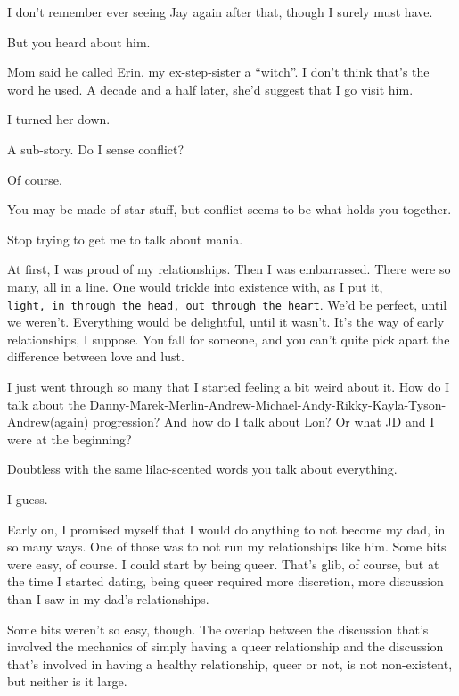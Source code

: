 \begin{leftcolumn}

I don't remember ever seeing Jay again after that, though I surely must have.

\begin{ally}
But you heard about him.
\end{ally}
Mom said he called Erin, my ex-step-sister a ``witch''. I don't think that's the word he used. A decade and a half later, she'd suggest that I go visit him.

I turned her down.

\begin{ally}
A sub-story. Do I sense conflict?
\end{ally}
Of course.

\begin{ally}
You may be made of star-stuff, but conflict seems to be what holds you together.
\end{ally}
Stop trying to get me to talk about mania.

At first, I was proud of my relationships. Then I was embarrassed. There were so many, all in a line. One would trickle into existence with, as I put it, \texttt{light,\ in\ through\ the\ head,\ out\ through\ the\ heart}. We'd be perfect, until we weren't. Everything would be delightful, until it wasn't. It's the way of early relationships, I suppose. You fall for someone, and you can't quite pick apart the difference between love and lust.

I just went through so many that I started feeling a bit weird about it. How do I talk about the Danny-Marek-Merlin-Andrew-Michael-Andy-Rikky-Kayla-Tyson-Andrew(again) progression? And how do I talk about Lon? Or what JD and I were at the beginning?

\begin{ally}
Doubtless with the same lilac-scented words you talk about everything.
\end{ally}
I guess.

Early on, I promised myself that I would do anything to not become my dad, in so many ways. One of those was to not run my relationships like him. Some bits were easy, of course. I could start by being queer. That's glib, of course, but at the time I started dating, being queer required more discretion, more discussion than I saw in my dad's relationships.

Some bits weren't so easy, though. The overlap between the discussion that's involved the mechanics of simply having a queer relationship and the discussion that's involved in having a healthy relationship, queer or not, is not non-existent, but neither is it large.


\end{leftcolumn}
